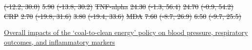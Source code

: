\documentclass[
  letterpaper,
  DIV=11,
  numbers=noendperiod]{scrartcl}
\makeatletter
\renewenvironment{table}%
   {\renewcommand\familydefault\sfdefault
    \@float{table}}
   {\end@float}
\providecommand{\DIFadd}[1]{{\protect\color{blue}\underline{#1}}} %
\providecommand{\DIFdel}[1]{{\protect\color{red}\sout{#1}}}                      %
\providecommand{\DIFaddFL}[1]{\DIFadd{#1}} %
\providecommand{\DIFdelFL}[1]{\DIFdel{#1}} %
\providecommand{\DIFaddbeginFL}{} %
\providecommand{\DIFdelendFL}{} %
\newcommand{\DIFaddincludegraphics}[2][]{{\color{blue}\fbox{\DIFOincludegraphics[#1]{#2}}}} %
\DeclareRobustCommand{\DIFaddbeginFL}{\DIFOaddbeginFL \let\includegraphics\DIFaddincludegraphics} %
\DeclareRobustCommand{\DIFdelendFL}{\DIFOaddendFL \let\includegraphics\DIFOincludegraphics} %
\makeatother
\begin{document}
\begin{table}
\DIFdelFL{(-12.2, 30.0) }%
\DIFdelFL{5.90 }%
\DIFdelFL{(-13.8, 30.2)}%
\DIFdelFL{\hspace{1em} }%
\DIFdelFL{TNF-alpha }%
\DIFdelFL{24.30 }%
\DIFdelFL{(-1.3, 56.4) }%
\DIFdelFL{24.70 }%
\DIFdelFL{(-0.9, 54.2)}%
\DIFdelFL{\hspace{1em} }%
\DIFdelFL{CRP }%
\DIFdelFL{2.70 }%
\DIFdelFL{(-19.8, 31.6) }%
\DIFdelFL{3.80 }%
\DIFdelFL{(-19.4, 33.6)}%
\DIFdelFL{MDA }%
\DIFdelFL{7.60 }%
\DIFdelFL{(-8.7, 26.9) }%
\DIFdelFL{6.50 }%
\DIFdelFL{(-9.7, 25.5)}%
\DIFdelendFL \DIFaddbeginFL \caption{\label{tbl-did-health}\DIFaddFL{Overall impacts of the `coal-to-clean
energy' policy on blood pressure, respiratory outcomes, and inflammatory
markers}}

\centering{

}
\end{table}
\end{document}
